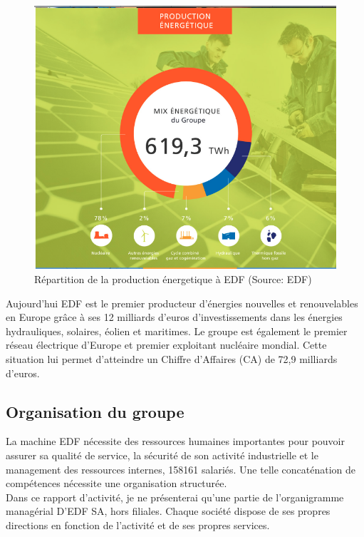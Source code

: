 \documentclass[11pt,a4paper]{article}
\begin{document}
\begin{figure}
 \centering
 \includegraphics[scale=0.5]{production.png}
 \caption{Répartition de la production énergetique à EDF (Source: EDF)}
 \label{figure_production}
\end{figure}
Aujourd’hui EDF est le premier producteur d’énergies nouvelles et renouvelables en Europe grâce à ses 12 milliards d’euros d’investissements dans les énergies hydrauliques, solaires, éolien et maritimes.
Le groupe est également le premier réseau électrique d’Europe et premier exploitant nucléaire mondial.
Cette situation lui permet d’atteindre un Chiffre d’Affaires (CA) de 72,9 milliards d’euros.

\subsection{Organisation du groupe}
La machine EDF nécessite des ressources humaines importantes pour pouvoir assurer sa qualité de service, la sécurité de son activité industrielle et le management des ressources internes, 158161 salariés. Une telle concaténation de compétences nécessite une organisation structurée.\\
Dans ce rapport d’activité, je ne présenterai qu’une partie de l’organigramme managérial D’EDF SA, hors filiales. Chaque société dispose de ses propres directions en fonction de l’activité et de ses propres services.
\end{document}
